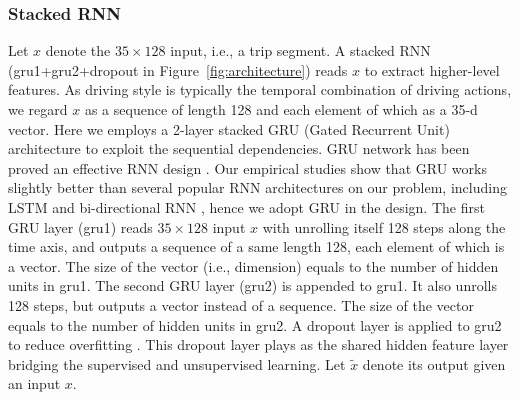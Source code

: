 \documentclass{article}
\begin{document}
\subsubsection{Stacked RNN}
Let $x$ denote the $35\times 128$ input, i.e., a trip segment.
A stacked RNN (gru1+gru2+dropout in Figure~\ref{fig:architecture}) reads $x$ to extract higher-level features.
As driving style is typically the temporal combination of driving actions, %
we regard $x$ as a sequence of length 128 and each element of which as a 35-d vector.
Here we employs a 2-layer stacked GRU (Gated Recurrent Unit) \cite{cho2014properties} architecture to exploit the sequential dependencies.
GRU network has been proved an effective RNN design \cite{chung2014empirical}.
Our empirical studies show that GRU works slightly better than several popular RNN architectures on our problem, including LSTM \cite{hochreiter1997LSTM} and bi-directional RNN \cite{schuster1997bidirectional}, hence we adopt GRU in the design.
The first GRU layer (gru1) reads $35\times 128$ input $x$ with unrolling itself 128 steps along the time axis, and outputs a sequence of a same length 128, each element of which is a vector.
The size of the vector (i.e., dimension) equals to the number of hidden units in gru1.
The second GRU layer (gru2) is appended to gru1. It also unrolls 128 steps, but outputs a vector instead of a sequence.
The size of the vector equals to the number of hidden units in gru2.
A dropout layer is applied to gru2 to reduce overfitting \cite{hinton2012improving}.
This dropout layer plays as the shared hidden feature layer bridging the supervised and unsupervised learning.
Let $\tilde{x}$ denote its output given an input $x$.
\end{document}
